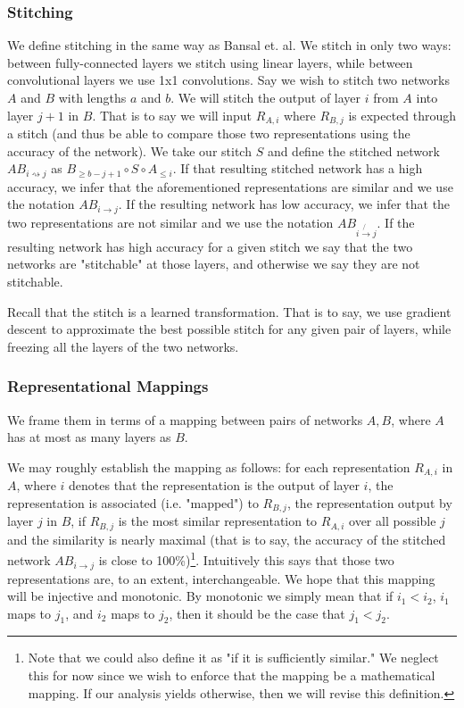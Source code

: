 \documentclass{article} %
\begin{document}
\subsubsection*{Stitching}
We define stitching in the same way as Bansal et. al. We stitch in only two ways: between fully-connected layers
we stitch using linear layers, while between convolutional layers we use 1x1 convolutions. Say we wish to stitch
two networks \(A\) and \(B\) with lengths \(a\) and \(b\). We will stitch the output of layer \(i\) from \(A\) into layer \(j+1\) in \(B\). That
is to say we will input \(R_{A,i}\) where \(R_{B,j}\) is expected through a stitch (and thus be able to compare those two 
representations using the accuracy of the network). We take our stitch \(S\) and define the stitched network \(AB_{i \rightsquigarrow j}\)
as \(B_{\geq b-j+1} \circ S \circ A_{\leq i}\). If that resulting stitched network has a high accuracy, we infer that the
aforementioned representations are similar and we use the notation \(AB_{i \rightarrow j}\). If the resulting network has low accuracy,
we infer that the two representations are not similar and we use the notation \(AB_{i \not{\rightarrow} j}\). If the resulting network
has high accuracy for a given stitch we say that the two networks are "stitchable" at those layers, and otherwise we say they are not
stitchable.

Recall that the stitch is a learned transformation. That is to say, we use gradient descent to approximate the best possible stitch
for any given pair of layers, while freezing all the layers of the two networks.

\subsubsection*{Representational Mappings}
We frame them in terms
of a mapping between pairs of networks \(A, B\), where \(A\) has at most as many layers as \(B\).

We may roughly establish the mapping as follows: for each representation \(R_{A,i}\)
in \(A\), where \(i\) denotes that the representation is the output of layer \(i\), the representation is associated (i.e. "mapped")
to \(R_{B,j}\), the representation output by layer \(j\) in \(B\), if \(R_{B,j}\) is the most similar representation to \(R_{A,i}\) over all possible \(j\) and the similarity is nearly maximal (that is to say, the accuracy of the stitched network \(AB_{i \rightarrow j}\) is close to 100\%)\footnote{Note that we could also define it as "if it is sufficiently similar." We neglect this for now since we wish to enforce that the mapping be a mathematical mapping. If our analysis yields otherwise, then we will revise this definition.}.
Intuitively this says that those two representations are, to an extent, interchangeable.  We hope that this mapping will be injective and monotonic.
By monotonic we simply mean that if \(i_{1} < i_{2}\), \(i_{1}\) maps to \(j_{1}\), and \(i_{2}\) maps to \(j_{2}\), then it should be the case that \(j_{1} < j_{2}\).
\end{document}
